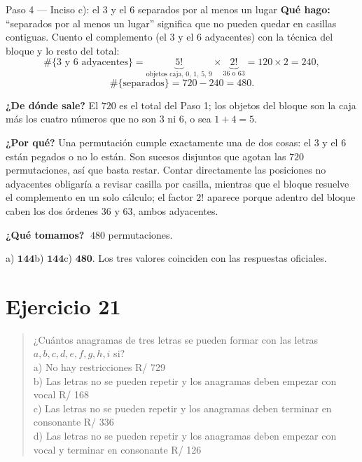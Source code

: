 \documentclass[11pt]{article}
\begin{document}
\begin{paso}{Paso 4 --- Inciso c): el 3 y el 6 separados por al menos un lugar}
\textbf{Qué hago:} ``separados por al menos un lugar'' significa que no pueden quedar en casillas
contiguas. Cuento el complemento (el $3$ y el $6$ adyacentes) con la técnica del bloque y lo resto del
total:
\[
\#\{3\text{ y }6\text{ adyacentes}\}=\underbrace{5!}_{\text{objetos caja},\,0,\,1,\,5,\,9}\times\underbrace{2!}_{36\text{ o }63}
=120\times2=240 ,
\]
\[
\#\{\text{separados}\}=720-240=480 .
\]

\textbf{¿De dónde sale?} El $720$ es el total del Paso 1; los objetos del bloque son la caja más los cuatro
números que no son $3$ ni $6$, o sea $1+4=5$.

\textbf{¿Por qué?} Una permutación cumple exactamente una de dos cosas: el $3$ y el $6$ están pegados o no
lo están. Son sucesos disjuntos que agotan las $720$ permutaciones, así que basta restar. Contar
directamente las posiciones no adyacentes obligaría a revisar casilla por casilla, mientras que el bloque
resuelve el complemento en un solo cálculo; el factor $2!$ aparece porque adentro del bloque caben los dos
órdenes $36$ y $63$, ambos adyacentes.

\textbf{¿Qué tomamos?} $\;480$ permutaciones.
\end{paso}

\begin{resp}
a) $\mathbf{144}$\quad b) $\mathbf{144}$\quad c) $\mathbf{480}$. Los tres valores coinciden con las
respuestas oficiales.
\end{resp}

\section*{Ejercicio 21}

\begin{quote}
¿Cuántos anagramas de tres letras se pueden formar con las letras $a,b,c,d,e,f,g,h,i$ si?\\
a) No hay restricciones \hfill R/ 729\\
b) Las letras no se pueden repetir y los anagramas deben empezar con vocal \hfill R/ 168\\
c) Las letras no se pueden repetir y los anagramas deben terminar en consonante \hfill R/ 336\\
d) Las letras no se pueden repetir y los anagramas deben empezar con vocal y terminar en consonante
\hfill R/ 126
\end{quote}
\end{document}
